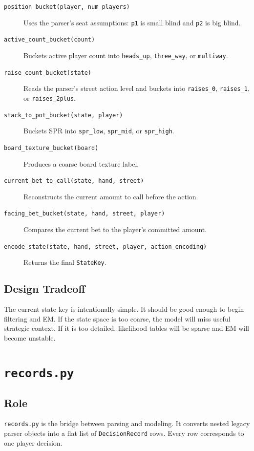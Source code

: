 \documentclass[11pt]{article}
\begin{document}
\begin{description}
  \item[\texttt{position\_bucket(player, num\_players)}] Uses the parser's seat
  assumptions: \texttt{p1} is small blind and \texttt{p2} is big blind.
  \item[\texttt{active\_count\_bucket(count)}] Buckets active player count into
  \texttt{heads\_up}, \texttt{three\_way}, or \texttt{multiway}.
  \item[\texttt{raise\_count\_bucket(state)}] Reads the parser's street action
  level and buckets into \texttt{raises\_0}, \texttt{raises\_1}, or
  \texttt{raises\_2plus}.
  \item[\texttt{stack\_to\_pot\_bucket(state, player)}] Buckets SPR into
  \texttt{spr\_low}, \texttt{spr\_mid}, or \texttt{spr\_high}.
  \item[\texttt{board\_texture\_bucket(board)}] Produces a coarse board texture
  label.
  \item[\texttt{current\_bet\_to\_call(state, hand, street)}] Reconstructs the
  current amount to call before the action.
  \item[\texttt{facing\_bet\_bucket(state, hand, street, player)}] Compares the
  current bet to the player's committed amount.
  \item[\texttt{encode\_state(state, hand, street, player, action\_encoding)}]
  Returns the final \texttt{StateKey}.
\end{description}

\subsection{Design Tradeoff}

The current state key is intentionally simple. It should be good enough to begin
filtering and EM. If the state space is too coarse, the model will miss useful
strategic context. If it is too detailed, likelihood tables will be sparse and
EM will become unstable.

\section{\texttt{records.py}}

\subsection{Role}

\texttt{records.py} is the bridge between parsing and modeling. It converts
nested legacy parser objects into a flat list of \texttt{DecisionRecord} rows.
Every row corresponds to one player decision.
\end{document}
